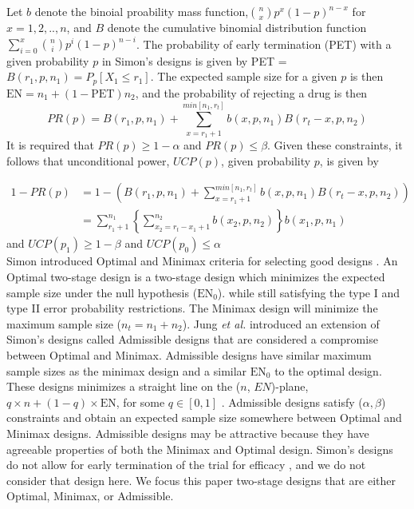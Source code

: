 \documentclass[12pt]{report}\usepackage[]{graphicx}\usepackage[]{color}
\newlength{\li}\setlength{\li}{14.48pt}
\newlength{\di}\setlength{\di}{-3.5mm}
\begin{document}
\indent Let $b$ denote the binoial proability mass function,${n \choose x} p^x(1-p)^{n-x}$ for $x =  1,2,..,n$, and $B$ denote the cumulative binomial distribution function $\sum_{i=0}^x {n \choose i} p^i(1-p)^{n-i}$. The probability of early termination (PET) with a given probability $p$ in Simon's designs is given by PET = $B(r_1, p, n_1) = P_p[X_1 \leq r_1]$. The expected sample size for a given $p$ is then $\mbox{EN} = n_1 + (1-\mbox{PET})n_2$, and the probability of rejecting a drug  is then  $$PR(p) = B(r_1, p, n_1) + \sum_{x=r_1+1}^{min[n_1,{r_t}]} b(x, p, n_1) B(r_t-x,p,n_2)$$ It is required that $PR(p) \geq 1-\alpha$ and $PR(p) \leq \beta$. Given these constraints, it follows that unconditional power, $UCP(p)$, given probability $p$, is given by 

\begin{equation*}
\begin{aligned}
1-PR(p) &= 1 - \left( B(r_1, p, n_1) + \sum_{x=r_1+1}^{min[n_1,{r_t}]} b(x, p, n_1) B(r_t-x,p,n_2) \right) \\
&= \sum_{r_1+1}^{n_1} \left\{\sum_{x_2 = r_t-x_1+1}^{n_2} b(x_2, p, n_2) \right\} b(x_1, p, n_1)
\end{aligned}
\end{equation*}
and $UCP(p_1) \geq 1-\beta$ and $UCP(p_0) \leq \alpha$ \\


\indent Simon introduced Optimal and Minimax criteria for selecting good designs \cite{Simon}. An Optimal two-stage design is a two-stage design which minimizes the expected sample size under the null hypothesis ($\mbox{EN}_0$). while still satisfying the type I and type II error probability restrictions. The Minimax design will minimize the maximum sample size ($n_t = n_1 + n_2$). Jung \textit{et al.} \cite{Jung} introduced an extension of Simon's designs called Admissible designs that are considered a compromise between Optimal and Minimax. Admissible designs  have similar maximum sample sizes as the minimax design and a similar $\mbox{EN}_0$ to the optimal design.  These designs minimizes a straight line on the ($n$, $EN$)-plane, $q \times n + (1-q) \times \mbox{EN}$, for some $q \in [0,1]$ \cite{Jung}. Admissible designs satisfy ($\alpha, \beta$) constraints and obtain an expected sample size somewhere between Optimal and Minimax designs. Admissible designs may be attractive because they have agreeable properties of both the Minimax and Optimal design.  Simon's designs do not allow for early termination of the trial for efficacy \cite{Simon}, and we do not consider that design here. We focus this paper two-stage designs that are either Optimal, Minimax, or Admissible. 
\end{document}
